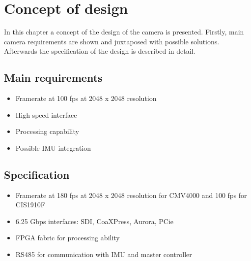 \chapter{Concept of design}
In this chapter a concept of the design of the camera is presented. Firstly, main camera requirements are shown and juxtaposed with possible solutions. Afterwards the specification of the design is described in detail.

\section{Main requirements}

\begin{itemize}
\item Framerate at 100 fps at 2048 x 2048 resolution
\item High speed interface 
\item Processing capability
\item Possible IMU integration
\end{itemize}

\section{Specification}

\begin{itemize}
\item Framerate at 180 fps at 2048 x 2048 resolution
for CMV4000 and 100 fps for CIS1910F
\item 6.25 Gbps interfaces: SDI, CoaXPress, Aurora, PCie
\item FPGA fabric for processing ability
\item RS485 for communication with IMU and master controller

\end{itemize}
